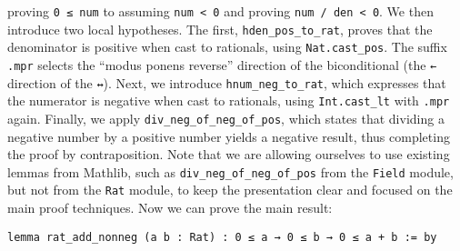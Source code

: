 \begin{example}
  proving \lstinline[language=lean]|0 ≤ num| to assuming \lstinline[language=lean]|num < 0|
  and proving \lstinline[language=lean]|num / den < 0|.
  We then introduce two local hypotheses. The first, \lstinline[language=lean]|hden_pos_to_rat|,
  proves that the denominator
  is positive when cast to rationals, using \lstinline[language=lean]|Nat.cast_pos|.
  The suffix \lstinline[language=lean]|.mpr| selects the ``modus ponens reverse''
  direction of the biconditional (the \lstinline[language=lean]|←|
  direction of the \lstinline[language=lean]|↔|).
  Next, we introduce \lstinline[language=lean]|hnum_neg_to_rat|,
  which expresses that the numerator is negative when cast to rationals, using \lstinline[language=lean]|Int.cast_lt| with \lstinline[language=lean]|.mpr| again.
  Finally, we apply \lstinline[language=lean]|div_neg_of_neg_of_pos|,
  which states that dividing a negative number by a positive number yields a
  negative result, thus completing the proof by contraposition.
  Note that we are allowing ourselves to use existing lemmas from Mathlib,
  such as \lstinline[language=lean]|div_neg_of_neg_of_pos| from the \lstinline[language=lean]|Field| module,
  but not from the \lstinline[language=lean]|Rat| module,
  to keep the presentation clear and focused on the main proof techniques.
  \newpage
  Now we can prove the main result:
  \begin{lstlisting}[language=lean]
lemma rat_add_nonneg (a b : Rat) : 0 ≤ a → 0 ≤ b → 0 ≤ a + b := by


\end{lstlisting}
\end{example}
